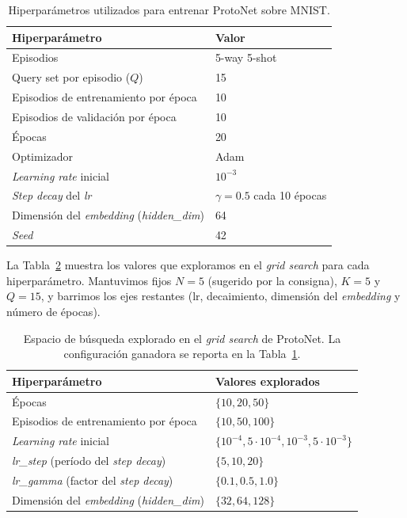 \documentclass[12pt]{article}
\begin{document}
\begin{table}[h]
    \centering
    \begin{tabular}{ll}
        \hline
        Hiperparámetro                       & Valor          \\
        \hline
        Episodios                            & 5-way 5-shot   \\
        Query set por episodio ($Q$)         & 15             \\
        Episodios de entrenamiento por época & 10             \\
        Episodios de validación por época    & 10             \\
        Épocas                               & 20             \\
        Optimizador                          & Adam           \\
        \textit{Learning rate} inicial       & $10^{-3}$      \\
        \textit{Step decay} del \textit{lr}  & $\gamma=0.5$ cada 10 épocas \\
        Dimensión del \textit{embedding} (\textit{hidden\_dim}) & 64 \\
        \textit{Seed}                        & 42             \\
        \hline
    \end{tabular}
    \caption{Hiperparámetros utilizados para entrenar ProtoNet sobre MNIST.}
    \label{tab:hp_protonet}
\end{table}

La Tabla~\ref{tab:gs_protonet} muestra los valores que exploramos en el \textit{grid search} para cada hiperparámetro. Mantuvimos fijos $N=5$ (sugerido por la consigna), $K=5$ y $Q=15$, y barrimos los ejes restantes (lr, decaimiento, dimensión del \textit{embedding} y número de épocas).

\begin{table}[H]
    \centering
    \begin{tabular}{ll}
        \hline
        Hiperparámetro                       & Valores explorados \\
        \hline
        Épocas                               & $\{10, 20, 50\}$ \\
        Episodios de entrenamiento por época & $\{10, 50, 100\}$ \\
        \textit{Learning rate} inicial       & $\{10^{-4}, 5 \cdot 10^{-4}, 10^{-3}, 5 \cdot 10^{-3}\}$ \\
        \textit{lr\_step} (período del \textit{step decay}) & $\{5, 10, 20\}$ \\
        \textit{lr\_gamma} (factor del \textit{step decay}) & $\{0.1, 0.5, 1.0\}$ \\
        Dimensión del \textit{embedding} (\textit{hidden\_dim}) & $\{32, 64, 128\}$ \\
        \hline
    \end{tabular}
    \caption{Espacio de búsqueda explorado en el \textit{grid search} de ProtoNet. La configuración ganadora se reporta en la Tabla~\ref{tab:hp_protonet}.}
    \label{tab:gs_protonet}
\end{table}
\end{document}
